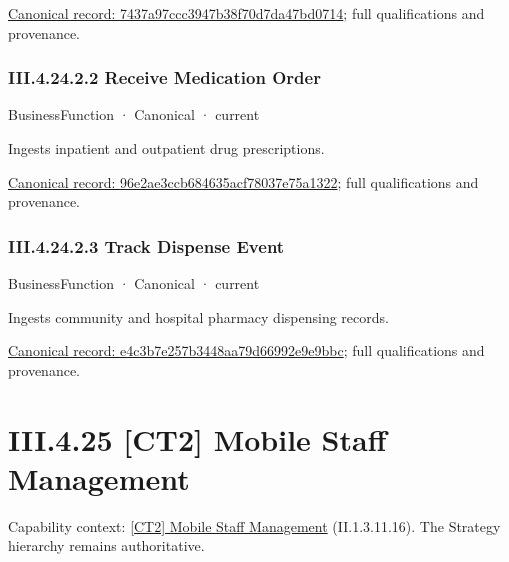 {\footnotesize \href{../../../../continuum/business/business-function/7437a97ccc3947b38f70d7da47bd0714.md}{Canonical record: 7437a97ccc3947b38f70d7da47bd0714}; full qualifications and provenance.}\par
\subsubsection*{III.4.24.2.2 Receive Medication Order}
\label{navigation:III.4.24.2.2}

\label{element:96e2ae3ccb684635acf78037e75a1322}
{\small BusinessFunction · Canonical · current}\par

Ingests inpatient and outpatient drug prescriptions.


{\footnotesize \href{../../../../continuum/business/business-function/96e2ae3ccb684635acf78037e75a1322.md}{Canonical record: 96e2ae3ccb684635acf78037e75a1322}; full qualifications and provenance.}\par
\subsubsection*{III.4.24.2.3 Track Dispense Event}
\label{navigation:III.4.24.2.3}

\label{element:e4c3b7e257b3448aa79d66992e9e9bbc}
{\small BusinessFunction · Canonical · current}\par

Ingests community and hospital pharmacy dispensing records.


{\footnotesize \href{../../../../continuum/business/business-function/e4c3b7e257b3448aa79d66992e9e9bbc.md}{Canonical record: e4c3b7e257b3448aa79d66992e9e9bbc}; full qualifications and provenance.}\par
\section*{III.4.25 [CT2] Mobile Staff Management}
\label{navigation:III.4.25}

{\small Capability context: \hyperref[element:79a4a48fddf74c69acf7e16404d06ea5]{[CT2] Mobile Staff Management} (II.1.3.11.16). The Strategy hierarchy remains authoritative.}\par
